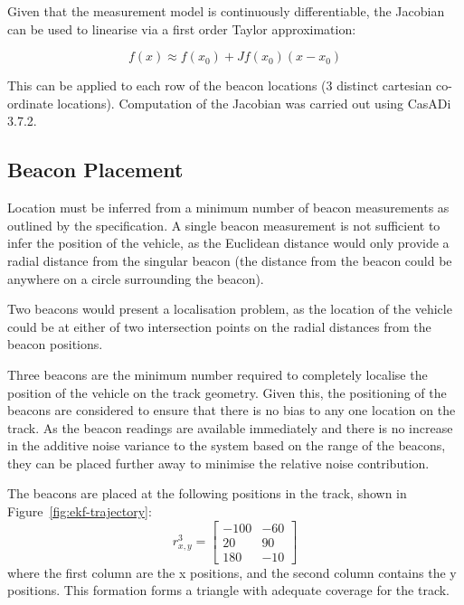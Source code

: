 Given that the measurement model is continuously differentiable, the Jacobian can be used to linearise via a first order Taylor approximation:

\begin{equation}
\label{eq:linearisation}
    f(x) \approx f(x_0) + Jf(x_0) (x - x_0)
\end{equation}

This can be applied to each row of the beacon locations (3 distinct cartesian co-ordinate locations). Computation of the Jacobian was carried out using CasADi 3.7.2\cite{casadi_2025_casadi}.

\subsection{Beacon Placement}
\label{sec:beacon}
Location must be inferred from a minimum number of beacon measurements as outlined by the specification. A single beacon measurement is not sufficient to infer the position of the vehicle, as the Euclidean distance would only provide a radial distance from the singular beacon (the distance from the beacon could be anywhere on a circle surrounding the beacon).

Two beacons would present a localisation problem, as the location of the vehicle could be at either of two intersection points on the radial distances from the beacon positions.

Three beacons are the minimum number required to completely localise the position of the vehicle on the track geometry. Given this, the positioning of the beacons are considered to ensure that there is no bias to any one location on the track. As the beacon readings are available immediately and there is no increase in the additive noise variance to the system based on the range of the beacons, they can be placed further away to minimise the relative noise contribution.

The beacons are placed at the following positions in the track, shown in Figure~\ref{fig:ekf-trajectory}:
\begin{equation}
    r_{x,y}^{3} = \begin{bmatrix} -100 & -60 \\ 20 & 90 \\ 180 & -10 \end{bmatrix}
\end{equation}
where the first column are the x positions, and the second column contains the y positions. This formation forms a triangle with adequate coverage for the track.
